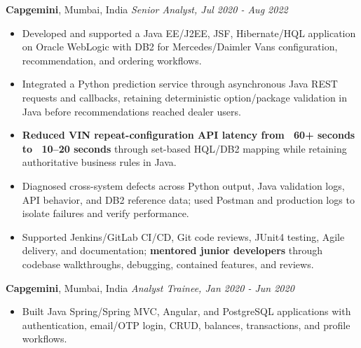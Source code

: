 \documentclass[11pt,letterpaper]{article}
\begin{document}
\textbf{Capgemini}, Mumbai, India \hfill \textit{Senior Analyst, Jul 2020 - Aug 2022}
\begin{itemize}
  \item Developed and supported a Java EE/J2EE, JSF, Hibernate/HQL application on Oracle WebLogic with DB2 for Mercedes/Daimler Vans configuration, recommendation, and ordering workflows.
  \item Integrated a Python prediction service through asynchronous Java REST requests and callbacks, retaining deterministic option/package validation in Java before recommendations reached dealer users.
  \item \textbf{Reduced VIN repeat-configuration API latency from ~60+ seconds to ~10--20 seconds} through set-based HQL/DB2 mapping while retaining authoritative business rules in Java.
  \item Diagnosed cross-system defects across Python output, Java validation logs, API behavior, and DB2 reference data; used Postman and production logs to isolate failures and verify performance.
  \item Supported Jenkins/GitLab CI/CD, Git code reviews, JUnit4 testing, Agile delivery, and documentation; \textbf{mentored junior developers} through codebase walkthroughs, debugging, contained features, and reviews.
\end{itemize}

\textbf{Capgemini}, Mumbai, India \hfill \textit{Analyst Trainee, Jan 2020 - Jun 2020}
\begin{itemize}
  \item Built Java Spring/Spring MVC, Angular, and PostgreSQL applications with authentication, email/OTP login, CRUD, balances, transactions, and profile workflows.
\end{itemize}
\end{document}
